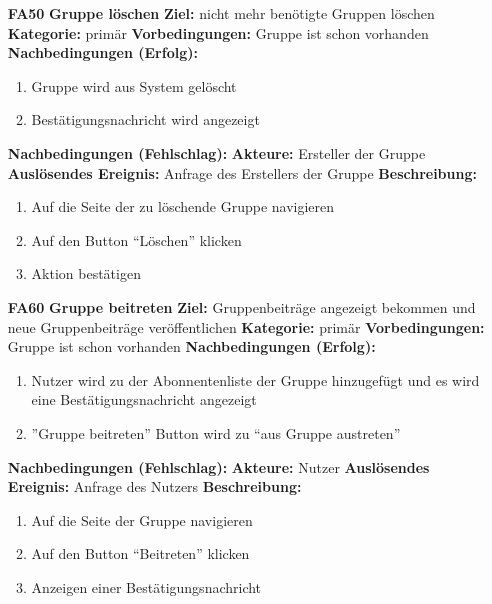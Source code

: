 \documentclass[parskip=full]{scrartcl}
\begin{document}
\begin{itemize}[nosep]
			\item[\textbf{FA50}]\textbf{Gruppe löschen}
						\newline \textbf{Ziel:} nicht mehr benötigte Gruppen löschen
						\newline \textbf{Kategorie:} primär
						\newline \textbf{Vorbedingungen:} Gruppe ist schon vorhanden
						\newline \textbf{Nachbedingungen (Erfolg):} 
						\begin{enumerate}[nosep]
							\item Gruppe wird aus System gelöscht
							\item Bestätigungsnachricht wird angezeigt
						\end{enumerate}
						\textbf{Nachbedingungen (Fehlschlag):}
						\newline \textbf{Akteure:} Ersteller der Gruppe
						\newline \textbf{Auslösendes Ereignis:} Anfrage des Erstellers der Gruppe
						\newline \textbf{Beschreibung:}
						\begin{enumerate}[nosep]
							\item Auf die Seite der zu löschende Gruppe navigieren
							\item Auf den Button “Löschen” klicken
							\item Aktion bestätigen\\
						\end{enumerate}
						
			\item[\textbf{FA60}]\textbf{Gruppe beitreten}
				\newline \textbf{Ziel:} Gruppenbeiträge angezeigt bekommen und neue Gruppenbeiträge veröffentlichen
				\newline \textbf{Kategorie:} primär
				\newline \textbf{Vorbedingungen:} Gruppe ist schon vorhanden
				\newline \textbf{Nachbedingungen (Erfolg):} 
					\begin{enumerate}[nosep]
						\item Nutzer wird zu der Abonnentenliste der Gruppe hinzugefügt und es wird eine Bestätigungsnachricht angezeigt
						\item ”Gruppe beitreten” Button wird zu “aus Gruppe austreten” 
					\end{enumerate}
				\textbf{Nachbedingungen (Fehlschlag):}
				\newline \textbf{Akteure:} Nutzer
				\newline \textbf{Auslösendes Ereignis:} Anfrage des Nutzers
				\newline \textbf{Beschreibung:}
					\begin{enumerate}[nosep]
						\item Auf die Seite der Gruppe navigieren
						\item Auf den Button “Beitreten” klicken
						\item Anzeigen einer Bestätigungsnachricht\\
					\end{enumerate}
									

\end{itemize}
\end{document}
